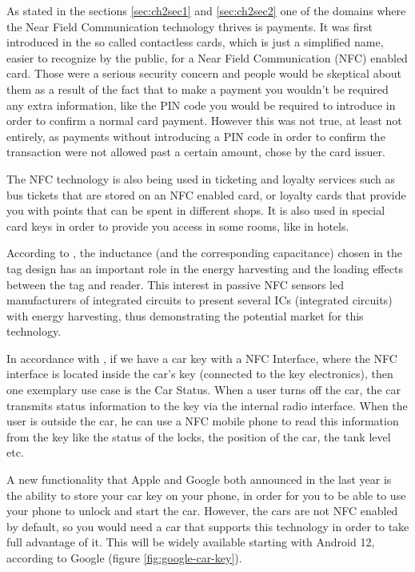 \par As stated in the sections \ref{sec:ch2sec1} and \ref{sec:ch2sec2} one of the domains where the Near Field Communication technology thrives is payments. It was first introduced in the so called contactless cards, which is just a simplified name, easier to recognize by the public, for a Near Field Communication (NFC) enabled card. Those were a serious security concern and people would be skeptical about them as a result of the fact that to make a payment you wouldn't be required any extra information, like the PIN code you would be required to introduce in order to confirm a normal card payment. However this was not true, at least not entirely, as payments without introducing a PIN code in order to confirm the transaction were not allowed past a certain amount, chose by the card issuer.

The NFC technology is also being used in ticketing and loyalty services such as bus tickets that are stored on an NFC enabled card, or loyalty cards that provide you with points that can be spent in different shops. It is also used in special card keys in order to provide you access in some rooms, like in hotels.

According to \cite{lazaro2018survey}, the inductance (and the corresponding capacitance) chosen in the tag design has an important role in the energy harvesting and the loading effects between the tag and reader. This interest in passive NFC sensors led manufacturers of integrated circuits to present several ICs (integrated circuits) with energy harvesting, thus demonstrating the potential market for this technology.

In accordance with \cite{steffen2010near}, if we have a car key with a NFC Interface, where the NFC interface is located inside the car’s key (connected to the key electronics), then one exemplary use case is the Car Status. When a user turns off the car, the car transmits status information to the key via the internal radio interface. When the user is outside the car, he can use a NFC mobile phone to read this information from the key like the status of the locks, the position of the car, the tank level etc.

A new functionality that Apple and Google both announced in the last year is the ability to store your car key on your phone, in order for you to be able to use your phone to unlock and start the car. However, the cars are not NFC enabled by default, so you would need a car that supports this technology in order to take full advantage of it. This will be widely available starting with Android 12, according to Google (figure \ref{fig:google-car-key}).


